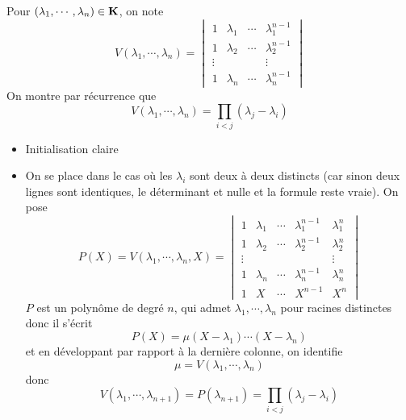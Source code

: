 Pour $(\lambda_1, \cdots , \lambda_n) \in  \mathbf K$, on note \[
    V(\lambda_1, \cdots , \lambda_n)= \begin{vmatrix}
        1 & \lambda_1 & \cdots & \lambda_1^{n-1} \\
        1 & \lambda_2 & \cdots & \lambda_2^{n-1} \\
        \vdots & & & \vdots \\
        1 & \lambda_n & \cdots & \lambda_n^{n-1}
    \end{vmatrix}
\] 
On montre par récurrence que \[
    V(\lambda_1, \cdots , \lambda_n)=\prod_{i<j}(\lambda_j-\lambda_i)
\] 
\begin{itemize}
    \item Initialisation claire
    \item On se place dans le cas où les $\lambda_i$ sont deux à deux distincts (car sinon deux lignes sont identiques, le déterminant et nulle et la formule reste vraie). On pose\[
            P(X)=V(\lambda_1, \cdots , \lambda_n, X)= \begin{vmatrix}
                1 & \lambda_1 & \cdots & \lambda_1^{n-1} & \lambda_1^n\\
        1 & \lambda_2 & \cdots & \lambda_2^{n-1}  & \lambda_2^n\\
        \vdots & & & &\vdots \\
        1 & \lambda_n & \cdots & \lambda_n^{n-1} & \lambda_n^n \\
        1 & X & \cdots & X^{n-1} & X^n
    \end{vmatrix}
    \] 
    $P$ est un polynôme de degré  $n$, qui admet  $\lambda_1, \cdots , \lambda_n$ pour racines distinctes donc il s'écrit \[
        P(X)=\mu(X-\lambda_1)\cdots (X-\lambda_n)
    \] 
    et en développant par rapport à la dernière colonne, on identifie \[
        \mu=V(\lambda_1, \cdots , \lambda_n)
    \] 
    donc \[
        V(\lambda_1, \cdots , \lambda_{n+1})=P(\lambda_{n+1})=\prod_{i<j}(\lambda_j-\lambda_i)
    \] 
\end{itemize}
